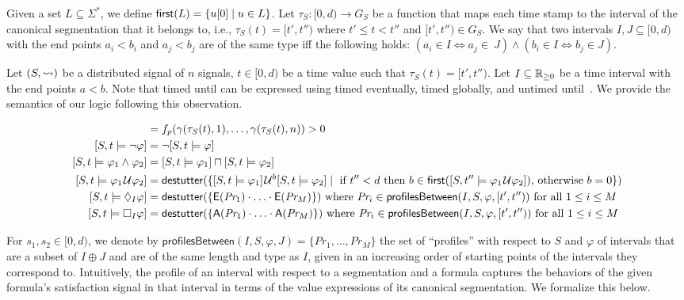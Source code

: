 Given a set $L \subseteq \Sigma^*$, we define $\first(L) = \{ u[0] \st u \in L\}$.
Let $\tau_S : [0,d) \to G_S$ be a function that maps each time stamp to the interval of the canonical segmentation that it belongs to, i.e., $\tau_S(t) = [t', t'')$ where $t' \leq t < t''$ and $[t', t'') \in G_S$.
We say that two intervals $I, J \subseteq [0,d)$ with the end points $a_i < b_i$ and $a_j < b_j$ are of the same type iff the following holds: $(a_i \in I \iff a_j \in~J) \land (b_i \in I \iff b_j \in J)$.

Let $(S, {\rightsquigarrow})$ be a distributed signal of $n$ signals, $t \in [0,d)$ be a time value such that $\tau_S(t) = [t', t'')$.
Let $I \subseteq \mathbb{R}_{\geq 0}$ be a time interval with the end points $a < b$.
Note that timed until can be expressed using timed eventually, timed globally, and untimed until~\cite{MalerN13}.
We provide the semantics of our logic following this observation.

\scriptsize
\begin{align*}
	[S,t \models p] &=  f_p(\gamma(\tau_S(t), 1), \ldots, \gamma(\tau_S(t), n)) > 0 \\
	[S,t \models \lnot \varphi] &= \lnot [S,t \models \varphi] \\
	[S,t \models \varphi_1 \land \varphi_2] &= [S,t \models \varphi_1] \sqcap [S,t \models \varphi_2] \\
	[S,t \models \varphi_1 \until \varphi_2] &= \destutter(\{ [S,t \models \varphi_1] \until^b [S,t \models \varphi_2] \st \text{ if $t'' < d$ then $b \in \first([S,t'' \models \varphi_1 \until \varphi_2])$, otherwise $b = 0$} \}) \\
	[S,t \models \LTLf_I \varphi] &= \destutter(\{ \mathsf{E}(\textit{Pr}_1) \cdot \ldots \cdot \mathsf{E}(\textit{Pr}_M) \}) \text{ where $\textit{Pr}_i \in \mathsf{profilesBetween}(I, S, \varphi, [t',t''))$ for all $1 \leq i \leq M$} \\
	[S,t \models \LTLg_I \varphi] &= \destutter(\{ \mathsf{A}(\textit{Pr}_1) \cdot \ldots \cdot \mathsf{A}(\textit{Pr}_M) \}) \text{ where $\textit{Pr}_i \in \mathsf{profilesBetween}(I, S, \varphi, [t',t''))$ for all $1 \leq i \leq M$}
\end{align*}
\normalsize

For $s_1, s_2 \in [0,d)$, we denote by $\mathsf{profilesBetween}(I, S, \varphi, J) = \{\textit{Pr}_1, \ldots, \textit{Pr}_M\}$ the set of ``profiles'' with respect to $S$ and $\varphi$ of intervals that are a subset of $I \oplus J$ and are of the same length and type as $I$, given in an increasing order of starting points of the intervals they correspond to.
Intuitively, the profile of an interval with respect to a segmentation and a formula captures the behaviors of the given formula's satisfaction signal in that interval in terms of the value expressions of its canonical segmentation.
We formalize this below.

